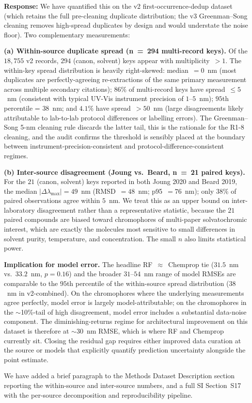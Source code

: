 \documentclass[11pt]{article}
\newcommand{\response}[1]{\noindent\textbf{Response:} #1\par\medskip}
\begin{document}
\response{We have quantified this on the v2 first-occurrence-dedup dataset (which retains the full pre-cleaning duplicate distribution; the v3 Greenman--Song cleaning removes high-spread duplicates by design and would understate the noise floor). Two complementary measurements:

\textbf{(a) Within-source duplicate spread (n~=~294 multi-record keys).} Of the $18{,}755$ v2 records, $294$ (canon, solvent) keys appear with multiplicity~$> 1$. The within-key spread distribution is heavily right-skewed: median~$= 0$~nm (most duplicates are perfectly-agreeing re-extractions of the same primary measurement across multiple secondary citations); $86$\% of multi-record keys have spread~$\leq 5$~nm (consistent with typical UV-Vis instrument precision of $1$--$5$~nm); $95$th percentile = $38$~nm; and $4.1$\% have spread~$> 50$~nm (large disagreements likely attributable to lab-to-lab protocol differences or labelling errors). The Greenman--Song 5-nm cleaning rule discards the latter tail, this is the rationale for the R1-8 cleaning, and the audit confirms the threshold is sensibly placed at the boundary between instrument-precision-consistent and protocol-difference-consistent regimes.

\textbf{(b) Inter-source disagreement (Joung vs.\ Beard, n~=~21 paired keys).} For the $21$ (canon, solvent) keys reported in both Joung 2020 and Beard 2019, the median $|\Delta\lambda_{\max}| = 49$~nm (RMSD~$= 48$~nm; p95~$= 76$~nm); only $38$\% of paired observations agree within $5$~nm. We treat this as an upper bound on inter-laboratory disagreement rather than a representative statistic, because the $21$ paired compounds are biased toward chromophores of multi-paper solvatochromic interest, which are exactly the molecules most sensitive to small differences in solvent purity, temperature, and concentration. The small $n$ also limits statistical power.

\textbf{Implication for model error.} The headline RF~$\approx$~Chemprop tie ($31.5$~nm vs.\ $33.2$~nm, $p = 0.16$) and the broader $31$--$54$~nm range of model RMSEs are comparable to the $95$th percentile of the within-source spread distribution ($38$~nm in v2-combined). On the chromophores where the underlying measurements agree perfectly, model error is largely model-attributable; on the chromophores in the $\sim$10\%-tail of high disagreement, model error includes a substantial data-noise component. The diminishing-returns regime for architectural improvement on this dataset is therefore at $\sim$30~nm RMSE, which is where RF and Chemprop currently sit. Closing the residual gap requires either improved data curation at the source or models that explicitly quantify prediction uncertainty alongside the point estimate.

We have added a brief paragraph to the Methods Dataset Description section reporting the within-source and inter-source numbers, and a full SI Section~S17 with the per-source decomposition and reproducibility pipeline.}
\end{document}
